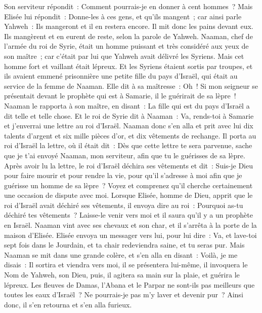 \begin{multicols}{2}
Son serviteur répondit~: Comment pourrais-je en donner à cent hommes~? Mais Elisée lui répondit~: Donne-les à ces gens, et qu'ils mangent~; car ainsi parle Yahweh~: Ils mangeront et il en restera encore.
Il mit donc les pains devant eux. Ils mangèrent et en eurent de reste, selon la parole de Yahweh.
\VerseOne{}Naaman, chef de l'armée du roi de Syrie, était un homme puissant et très considéré aux yeux de son maître~; car c'était par lui que Yahweh avait délivré les Syriens. Mais cet homme fort et vaillant était lépreux.
Et les Syriens étaient sortis par troupes, et ils avaient emmené prisonnière une petite fille du pays d'Israël, qui était au service de la femme de Naaman.
Elle dit à sa maîtresse~: Oh~! Si mon seigneur se présentait devant le prophète qui est à Samarie, il le guérirait de sa lèpre~!
Naaman le rapporta à son maître, en disant~: La fille qui est du pays d'Israël a dit telle et telle chose.
Et le roi de Syrie dit à Naaman~: Va, rends-toi à Samarie et j'enverrai une lettre au roi d'Israël. Naaman donc s'en alla et prit avec lui dix talents d'argent et six mille pièces d'or, et dix vêtements de rechange.
Il porta au roi d'Israël la lettre, où il était dit~: Dès que cette lettre te sera parvenue, sache que je t'ai envoyé Naaman, mon serviteur, afin que tu le guérisses de sa lèpre.
Après avoir lu la lettre, le roi d'Israël déchira ses vêtements et dit~: Suis-je Dieu pour faire mourir et pour rendre la vie, pour qu'il s'adresse à moi afin que je guérisse un homme de sa lèpre~? Voyez et comprenez qu'il cherche certainement une occasion de dispute avec moi.
Lorsque Elisée, homme de Dieu, apprit que le roi d'Israël avait déchiré ses vêtements, il envoya dire au roi~: Pourquoi as-tu déchiré tes vêtements~? Laisse-le venir vers moi et il saura qu'il y a un prophète en Israël.
Naaman vint avec ses chevaux et son char, et il s'arrêta à la porte de la maison d'Elisée.
Elisée envoya un messager vers lui, pour lui dire~: Va, et lave-toi sept fois dans le Jourdain, et ta chair redeviendra saine, et tu seras pur.
Mais Naaman se mit dans une grande colère, et s'en alla en disant~: Voilà, je me disais~: Il sortira et viendra vers moi, il se présentera lui-même, il invoquera le Nom de Yahweh, son Dieu, puis, il agitera sa main sur la plaie, et guérira le lépreux.
Les fleuves de Damas, l'Abana et le Parpar ne sont-ils pas meilleurs que toutes les eaux d'Israël~? Ne pourrais-je pas m'y laver et devenir pur~? Ainsi donc, il s'en retourna et s'en alla furieux.

\end{multicols}
